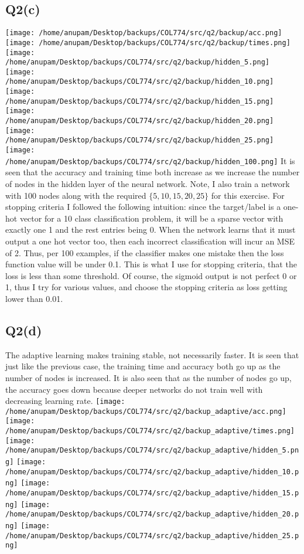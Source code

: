\documentclass[11pt]{article}
\begin{document}
\subsection{Q2(c)}
\label{sec-2-3}
\texttt{[image: /home/anupam/Desktop/backups/COL774/src/q2/backup/acc.png]}
\texttt{[image: /home/anupam/Desktop/backups/COL774/src/q2/backup/times.png]}
\texttt{[image: /home/anupam/Desktop/backups/COL774/src/q2/backup/hidden\_5.png]}
\texttt{[image: /home/anupam/Desktop/backups/COL774/src/q2/backup/hidden\_10.png]}
\texttt{[image: /home/anupam/Desktop/backups/COL774/src/q2/backup/hidden\_15.png]}
\texttt{[image: /home/anupam/Desktop/backups/COL774/src/q2/backup/hidden\_20.png]}
\texttt{[image: /home/anupam/Desktop/backups/COL774/src/q2/backup/hidden\_25.png]}
\texttt{[image: /home/anupam/Desktop/backups/COL774/src/q2/backup/hidden\_100.png]}
It is seen that the accuracy and training time both increase as we
increase the number of nodes in the hidden layer of the neural
network. Note, I also train a network with 100 nodes along with the
required \(\{5,10,15,20,25\}\) for this exercise.
For stopping criteria I followed the following intuition: since the
target/label is a one-hot vector for a 10 class classification
problem, it will be a sparse vector with exactly one 1 and the rest
entries being 0. When the network learns that it must output a one hot
vector too, then each incorrect classification will incur an MSE
of 2. Thus, per 100 examples, if the classifier makes one mistake then
the loss function value will be under 0.1. This is what I use for
stopping criteria, that the loss is less than some threshold. Of
course, the sigmoid output is not perfect 0 or 1, thus I try for
various values, and choose the stopping criteria as loss getting lower
than 0.01.
\subsection{Q2(d)}
\label{sec-2-4}
The adaptive learning makes training stable, not necessarily
faster. It is seen that just like the previous case, the training time
and accuracy both go up as the number of nodes is increased. It is
also seen that as the number of nodes go up, the accuracy goes down
because deeper networks do not train well with decreasing learning
rate.
\texttt{[image: /home/anupam/Desktop/backups/COL774/src/q2/backup\_adaptive/acc.png]}
\texttt{[image: /home/anupam/Desktop/backups/COL774/src/q2/backup\_adaptive/times.png]}
\texttt{[image: /home/anupam/Desktop/backups/COL774/src/q2/backup\_adaptive/hidden\_5.png]}
\texttt{[image: /home/anupam/Desktop/backups/COL774/src/q2/backup\_adaptive/hidden\_10.png]}
\texttt{[image: /home/anupam/Desktop/backups/COL774/src/q2/backup\_adaptive/hidden\_15.png]}
\texttt{[image: /home/anupam/Desktop/backups/COL774/src/q2/backup\_adaptive/hidden\_20.png]}
\texttt{[image: /home/anupam/Desktop/backups/COL774/src/q2/backup\_adaptive/hidden\_25.png]}
\end{document}
